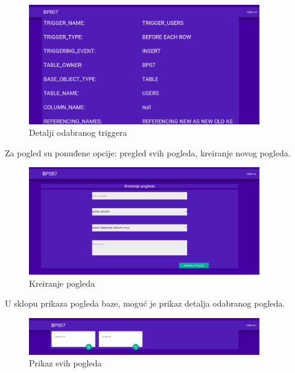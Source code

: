 \documentclass[12pt, a4paper]{report}
\theoremstyle{definition}
\begin{document}
\begin{figure}[H]
	\begin{center} 
		\includegraphics[width=0.9\textwidth]{a10.png}
	\end{center}
	\caption{Detalji odabranog triggera}
\end{figure}

\newpage
Za pogled su ponuđene opcije: pregled svih pogleda, kreiranje novog pogleda.


\begin{figure}[H]
	\begin{center} 
		\includegraphics[width=0.9\textwidth]{a19.png}
	\end{center}
	\caption{Kreiranje pogleda }
\end{figure}
U sklopu prikaza pogleda baze, moguć je prikaz detalja odabranog pogleda.
\begin{figure}[H]
	\begin{center} 
		\includegraphics[width=0.9\textwidth]{a13.png}
	\end{center}
	\caption{Prikaz svih pogleda}
\end{figure}
\end{document}
